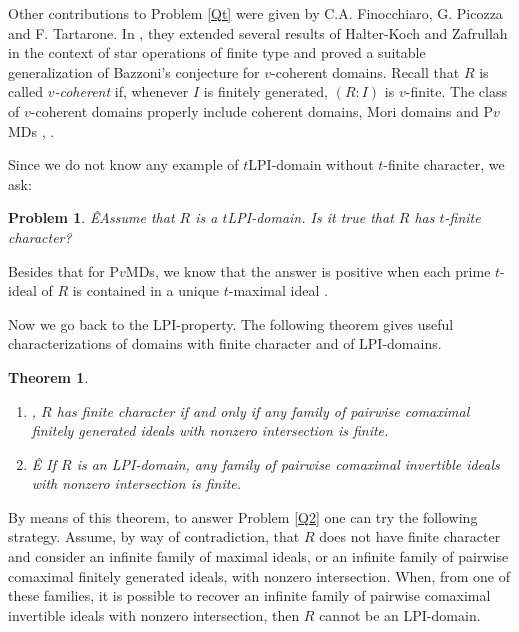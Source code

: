\documentclass[12pt]{amsart}
\newtheorem{theorem}{Theorem}
\newtheorem{Qu}{Problem}
\theoremstyle{definition}
\begin{document}
Other contributions to Problem \ref{Qt} were given by C.A. Finocchiaro, G. Picozza and F. Tartarone. In \cite{FPT}, they extended  several results of Halter-Koch and Zafrullah in the context of star operations of finite type and proved a suitable generalization of Bazzoni's conjecture for $v$-coherent domains. 
Recall that 
$R$ is called \emph{$v$-coherent} if, whenever  $I$ is finitely generated, $(R:I)$ is $v$-finite. The class of $v$-coherent domains properly include coherent domains, Mori domains and P$v$MDs \cite[Example 1]{N}, \cite{GaH}.

Since we do not know any example of $t$LPI-domain without $t$-finite character, we ask:

 \begin{Qu} \cite[p. 657]{Za}Ê\label{Qt2} Assume that $R$ is a $t$LPI-domain. Is it true that $R$ has $t$-finite character?
\end{Qu}

Besides that for P$v$MDs, we know that the answer is positive when each prime $t$-ideal of $R$ is contained in a unique $t$-maximal ideal \cite[Proposition 5.7]{GP1}.
 
Now we go back to the LPI-property. The following theorem gives useful characterizations of domains with finite character and of LPI-domains.

\begin{theorem} \label{teoFPT} 
\begin{enumerate}

\item[(1)]  \cite[Proposition 1.6]{FPT}, \cite[Corollary 4]{ZD} $R$ has finite character if and only if  any family of pairwise  comaximal  finitely generated ideals with nonzero intersection is finite.

\item[(2)]Ê\cite[Theorem 1]{Za}  If $R$ is an LPI-domain,  any family of pairwise  comaximal invertible ideals with nonzero intersection is finite.
\end{enumerate}
\end{theorem}

By means of this theorem, to answer Problem \ref{Q2} one can try the following strategy. Assume, by way of contradiction, that $R$ does not have finite character and consider an infinite family  of maximal ideals, or an infinite family of pairwise  comaximal  finitely generated ideals, with nonzero intersection. When, from one of these families, it is possible to recover an infinite family of pairwise  comaximal  invertible ideals with nonzero intersection, then $R$ cannot be an LPI-domain.
\end{document}

